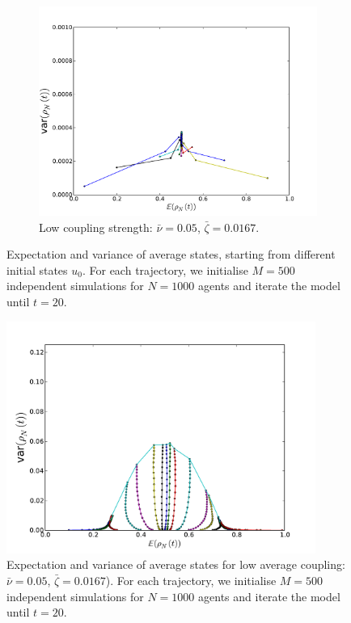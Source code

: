 \documentclass[]{article}
\begin{document}
\begin{figure}
\begin{subfigure}[b]{0.7\textwidth}
\includegraphics[width=\textwidth]{variance_mean_N1000_M500_mixed_fully_20timesteps.pdf}
\caption{ Low coupling strength: $\bar{\nu}=0.05$, $\bar{\zeta}=0.0167$.}
\label{fig:fig:variance_mean_mixed}
\end{subfigure}
\caption{Expectation and variance of average states, starting from different initial states $u_0$. For each trajectory, we initialise $M=500$ independent simulations for $N=1000$ agents and iterate the model until $t=20$.}
\label{fig:fig:variance_mean}
\end{figure}


\begin{figure}
\includegraphics[width=0.9\textwidth]{variance_mean_N1000_M500_intermediate_fully_20timesteps.pdf}
\caption{ Expectation and variance of average states for low average coupling: $\bar{\nu}=0.05$, $\bar{\zeta}=0.0167$). For each trajectory, we initialise $M=500$ independent simulations for $N=1000$ agents and iterate the model until $t=20$.}
\label{fig:fig:variance_mean_inter}
\end{figure}
\end{document}
